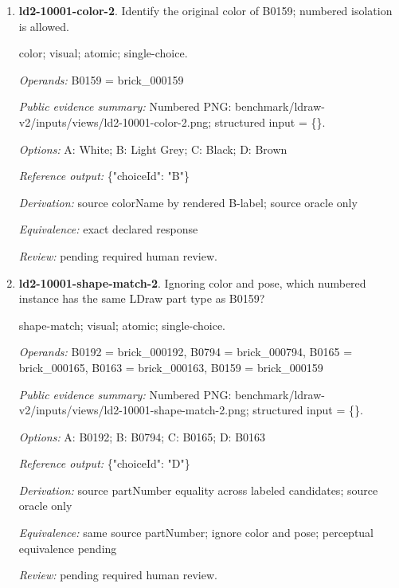 \begin{enumerate}
\par{\small distance; source-data; atomic; single-choice.\par\textit{Operands:} B0115 = brick\_000115, B0272 = brick\_000272, B0050 = brick\_000050, B0720 = brick\_000720\par\textit{Public evidence summary:} \{"coordinateFrame": "Viewer world, millimeters, Euclidean distance", "centers": \{"B0115": [-74.436799, 20.8, 3.551199], "B0720": [343.856, 20.8, 30.516], "B0050": [-39.756, 13.2228, -92], "B0272": [-109.031199, 68.8, 0.431199]\}\}\par\textit{Options:} A: B0272; B: B0720; C: B0050\par\textit{Reference output:} \{"choiceId": "A"\}\par\textit{Derivation:} Euclidean norm from public rounded centers\par\textit{Equivalence:} exact declared response\par\textit{Review:} machine checks passed; no human certification.}
\item \textbf{ld2-10001-color-2}. Identify the original color of B0159; numbered isolation is allowed.
\par{\small color; visual; atomic; single-choice.\par\textit{Operands:} B0159 = brick\_000159\par\textit{Public evidence summary:} Numbered PNG: benchmark/ldraw-v2/inputs/views/ld2-10001-color-2.png; structured input = \{\}.\par\textit{Options:} A: White; B: Light Grey; C: Black; D: Brown\par\textit{Reference output:} \{"choiceId": "B"\}\par\textit{Derivation:} source colorName by rendered B-label; source oracle only\par\textit{Equivalence:} exact declared response\par\textit{Review:} pending required human review.}
\item \textbf{ld2-10001-shape-match-2}. Ignoring color and pose, which numbered instance has the same LDraw part type as B0159?
\par{\small shape-match; visual; atomic; single-choice.\par\textit{Operands:} B0192 = brick\_000192, B0794 = brick\_000794, B0165 = brick\_000165, B0163 = brick\_000163, B0159 = brick\_000159\par\textit{Public evidence summary:} Numbered PNG: benchmark/ldraw-v2/inputs/views/ld2-10001-shape-match-2.png; structured input = \{\}.\par\textit{Options:} A: B0192; B: B0794; C: B0165; D: B0163\par\textit{Reference output:} \{"choiceId": "D"\}\par\textit{Derivation:} source partNumber equality across labeled candidates; source oracle only\par\textit{Equivalence:} same source partNumber; ignore color and pose; perceptual equivalence pending\par\textit{Review:} pending required human review.}

\end{enumerate}
